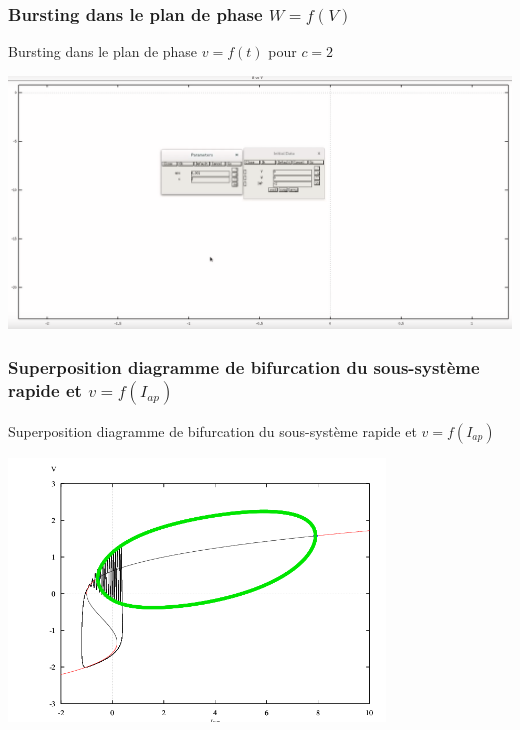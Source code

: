 \documentclass[xcolor={dvipsnames},10pt]{beamer}
\begin{document}
\subsubsection*{Bursting dans le plan de phase \texorpdfstring{$W=f(V)$}{Lg}}


\begin{frame}{Bursting dans le plan de phase $v=f(t)$ pour $c = 2$}
\begin{center}
\href{https://drive.google.com/open?id=0ByPBcq8q0ou_TFloLXphQjVBQ0k}{\includegraphics[width =  1.0\textwidth]{Burst_c_2_phase}}
\end{center}
\end{frame}

\subsubsection*{Superposition diagramme de bifurcation du sous-système rapide et \texorpdfstring{$v=f(I_{ap})$}{Lg}}


\begin{frame}{Superposition diagramme de bifurcation du sous-système rapide et $v=f(I_{ap})$}
\begin{center}
\includegraphics[height = 7cm]{superpositionC2}
\end{center}
\end{frame}
\end{document}
